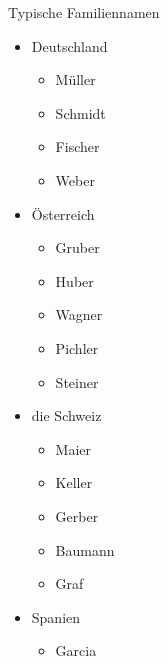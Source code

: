 \begin{semantics}{Typische Familiennamen}{}
\begin{itemize}
	\item Deutschland
		\begin{itemize}
			\item Müller
			\item Schmidt
			\item Fischer
			\item Weber
		\end{itemize}
	\item Österreich
		\begin{itemize}
			\item Gruber
			\item Huber
			\item Wagner
			\item Pichler
			\item Steiner
		\end{itemize}
	\item die Schweiz
		\begin{itemize}
			\item Maier
			\item Keller
			\item Gerber
			\item Baumann
			\item Graf
		\end{itemize}
	\item Spanien
		\begin{itemize}
			\item Garcia
		\end{itemize}
\end{itemize}
\end{semantics}
